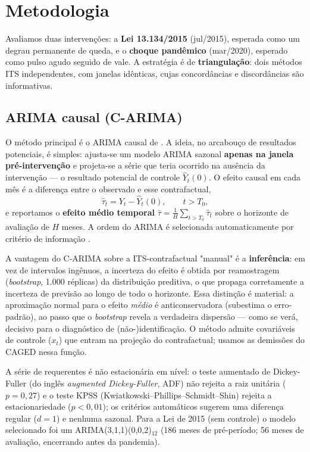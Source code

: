 \documentclass[12pt,a4paper]{article}
\begin{document}
\section{Metodologia}

Avaliamos duas intervenções: a \textbf{Lei 13.134/2015} (jul/2015), esperada como um degrau permanente de queda, e o \textbf{choque pandêmico} (mar/2020), esperado como pulso agudo seguido de vale. A estratégia é de \textbf{triangulação}: dois métodos ITS independentes, com janelas idênticas, cujas concordâncias e discordâncias são informativas.

\subsection{ARIMA causal (C-ARIMA)}
O método principal é o ARIMA causal de \citet{menchetti2023carima}. A ideia, no arcabouço de resultados potenciais, é simples: ajusta-se um modelo ARIMA sazonal \textbf{apenas na janela pré-intervenção} e projeta-se a série que teria ocorrido na ausência da intervenção --- o resultado potencial de controle $\widehat{Y}_t(0)$. O efeito causal em cada mês é a diferença entre o observado e esse contrafactual,
\[
\widehat{\tau}_t = Y_t - \widehat{Y}_t(0), \qquad t > T_0,
\]
e reportamos o \textbf{efeito médio temporal} $\bar{\tau} = \frac{1}{H}\sum_{t>T_0}\widehat{\tau}_t$ sobre o horizonte de avaliação de $H$ meses. A ordem do ARIMA é selecionada automaticamente por critério de informação \citep{hyndmankhandakar2008forecast}.

A vantagem do C-ARIMA sobre a ITS-contrafactual "manual" é a \textbf{inferência}: em vez de intervalos ingênuos, a incerteza do efeito é obtida por reamostragem (\textit{bootstrap}, 1.000 réplicas) da distribuição preditiva, o que propaga corretamente a incerteza de previsão ao longo de todo o horizonte. Essa distinção é material: a aproximação normal para o efeito \textit{médio} é anticonservadora (subestima o erro-padrão), ao passo que o \textit{bootstrap} revela a verdadeira dispersão --- como se verá, decisivo para o diagnóstico de (não-)identificação. O método admite covariáveis de controle ($x_t$) que entram na projeção do contrafactual; usamos as demissões do CAGED nessa função.

A série de requerentes é não estacionária em nível: o teste aumentado de Dickey-Fuller (do inglês \textit{augmented Dickey-Fuller}, ADF) não rejeita a raiz unitária ($p = 0{,}27$) e o teste KPSS (Kwiatkowski--Phillips--Schmidt--Shin) rejeita a estacionariedade ($p < 0{,}01$); os critérios automáticos sugerem uma diferença regular ($d=1$) e nenhuma sazonal. Para a Lei de 2015 (sem controle) o modelo selecionado foi um ARIMA(3,1,1)(0,0,2)$_{12}$ (186 meses de pré-período; 56 meses de avaliação, encerrando antes da pandemia).
\end{document}
